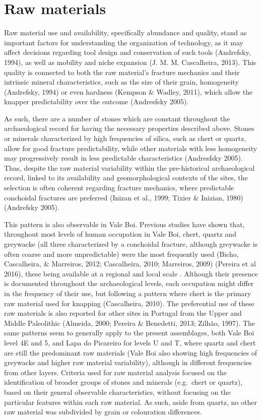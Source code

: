 \documentclass[12pt,twoside]{reedthesis}
\begin{document}
\hypertarget{raw-materials}{%
\section{Raw materials}\label{raw-materials}}

Raw material use and availability, specifically abundance and quality, stand as important factors for understanding the organization of technology, as it may affect decisions regarding tool design and conservation of such tools (Andrefsky, 1994), as well as mobility and niche expansion (J. M. M. Cascalheira, 2013). This quality is connected to both the raw material's fracture mechanics and their intrinsic mineral characteristics, such as the size of their grain, homogeneity (Andrefsky, 1994) or even hardness (Kempson \& Wadley, 2011), which allow the knapper predictability over the outcome (Andresfsky 2005).

As such, there are a number of stones which are constant throughout the archaeological record for having the necessary properties described above. Stones or minerals characterized by high frequencies of silica, such as chert or quartz, allow for good fracture predictability, while other materials with less homogeneity may progressively result in less predictable characteristics (Andresfsky 2005). Thus, despite the raw material variability within the pre-historical archaeological record, linked to its availability and geomorphological contexts of the sites, the selection is often coherent regarding fracture mechanics, where predictable conchoidal fractures are preferred (Inizan et al., 1999; Tixier \& Inizian, 1980) (Andrefsky 2005).

This pattern is also observable in Vale Boi. Previous studies have shown that, throughout most levels of human occupation in Vale Boi, chert, quartz and greywacke (all three characterized by a conchoidal fracture, although greywacke is often coarse and more unpredictable) were the most frequently used (Bicho, Cascalheira, \& Marreiros, 2012; Cascalheira, 2010; Marreiros, 2009) (Pereira et al 2016), these being available at a regional and local scale . Although their presence is documented throughout the archaeological levels, each occupation might differ in the frequency of their use, but following a pattern where chert is the primary raw material used for knapping (Cascalheira, 2010). The preferential use of these raw materials is also reported for other sites in Portugal from the Upper and Middle Paleolithic (Almeida, 2000; Pereira \& Benedetti, 2013; Zilhão, 1997).
The same patterns seem to generally apply to the present assemblages, both Vale Boi level 4E and 5, and Lapa do Picareiro for levels U and T, where quartz and chert are still the predominant raw materials (Vale Boi also showing high frequencies of greywacke and higher raw material variability), although in different frequencies from other layers.
Criteria used for raw material analysis focused on the identification of broader groups of stones and minerals (e.g.~chert or quartz), based on their general observable characteristics, without focusing on the particular features within each raw material. As such, aside from quartz, no other raw material was subdivided by grain or colouration differences.
\end{document}
